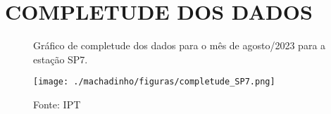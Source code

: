 \section{COMPLETUDE DOS DADOS}

\begin{figure}[htb!]
    \centering
	\captionsetup{justification=raggedright, singlelinecheck=false, width=1\textwidth}
    \caption{Gráfico de completude dos dados para o mês de agosto/2023 para a estação SP7.}
    \begin{mdframed}[
        linecolor=black,
        linewidth=1pt,
        roundcorner=10pt,
    ]
    \texttt{[image: ./machadinho/figuras/completude\_SP7.png]} %
    \end{mdframed}
    \caption*{Fonte: IPT}
    \label{fig:completude}
\end{figure}

